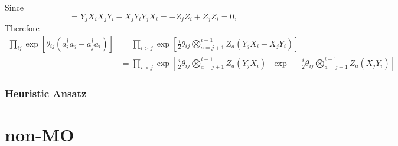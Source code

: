 \documentclass[11pt, oneside]{article}   	%
\begin{document}
Since 
\begin{equation}
[Y_j X_i, X_j Y_i] = Y_j X_i X_j Y_i - X_j Y_i Y_j X_i = - Z_j Z_i + Z_j Z_i  = 0,
\end{equation}
Therefore
\begin{align}
\prod_{ij} \exp \left[ \theta_{ij} (a^{\dagger}_i a_j - a^{\dagger}_j a_i) \right] 
&= \prod_{i > j} \exp \left[ \frac{i}{2} \theta_{ij} \bigotimes^{i-1}_{a=j+1} Z_a  (Y_j X_i - X_j Y_i) \right] \\
&= \prod_{i>j} 
\exp \left[ \frac{i}{2} \theta_{ij} \bigotimes^{i-1}_{a=j+1} Z_a  (Y_j X_i) \right] 
\exp \left[ - \frac{i}{2} \theta_{ij} \bigotimes^{i-1}_{a=j+1} Z_a  (X_j Y_i) \right]
\end{align}

\subsubsection{Heuristic Ansatz}

\section{non-MO}
\end{document}
